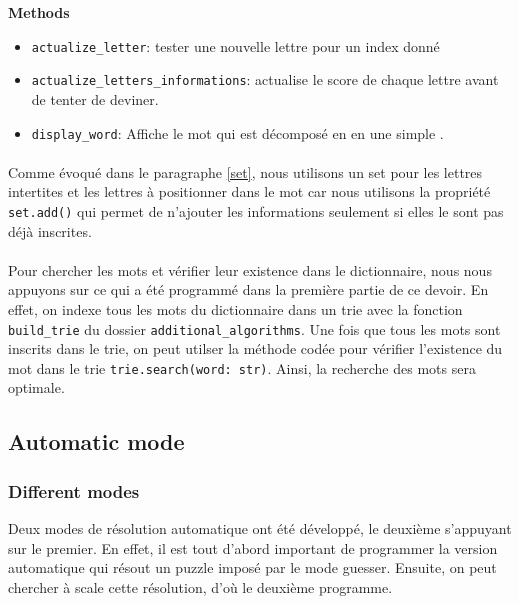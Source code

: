 \documentclass[10pt,a4paper,hidelinks]{article}
\begin{document}
\textbf{Methods}
\begin{itemize}
    \setcounter{enumi}{-1}
    \item \verb|actualize_letter|: tester une nouvelle lettre pour un index donné
    \item \verb|actualize_letters_informations|: actualise le score de chaque lettre avant de tenter de deviner.
    \item \verb|display_word|: Affiche le mot qui est décomposé en  en une simple .
\end{itemize}

\paragraph{}
Comme évoqué dans le paragraphe \ref{set}, nous utilisons un set pour les lettres intertites et les lettres à positionner dans le mot car nous utilisons la propriété \verb|set.add()| qui permet de n'ajouter les informations seulement si elles le sont pas déjà inscrites.

\paragraph{}
Pour chercher les mots et vérifier leur existence dans le dictionnaire, nous nous appuyons sur ce qui a été programmé dans la première partie de ce devoir. En effet, on indexe tous les mots du dictionnaire dans un trie avec la fonction \verb|build_trie| du dossier \verb|additional_algorithms|. Une fois que tous les mots sont inscrits dans le trie, on peut utilser la méthode codée pour vérifier l'existence du mot dans le trie \verb|trie.search(word: str)|.
Ainsi, la recherche des mots sera optimale.


\subsection{Automatic mode}

\subsubsection{Different modes}
Deux modes de résolution automatique ont été développé, le deuxième s'appuyant sur le premier. En effet, il est tout d'abord important de programmer la version automatique qui résout un puzzle imposé par le mode guesser. Ensuite, on peut chercher à scale cette résolution, d'où le deuxième programme.
\end{document}
